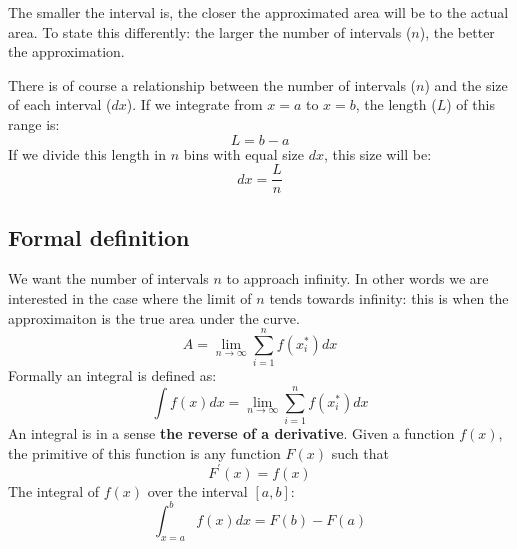 \documentclass[a4paper]{report}
\begin{document}
The smaller the interval is, the closer the approximated area will be to the actual area. To state this differently: the larger the number of intervals ($n$), the better the approximation. 
\begin{mdframed}
There is of course a relationship between the number of intervals ($n$) and the size of each interval ($dx$). If we integrate from $x=a$ to $x=b$, the length ($L$) of this range is:
\begin{equation*}
L = b - a
\end{equation*}
If we divide this length in $n$ bins with equal size $dx$, this size will be:
\begin{equation*}
dx = \frac{L}{n}
\end{equation*}
\end{mdframed}


\subsection{Formal definition}
We want the number of intervals $n$ to approach infinity. In other words we are interested in the case where the limit of $n$ tends towards infinity: this is when the approximaiton is the true area under the curve.
\begin{equation}
A=\lim\limits_{n \to \infty}\sum\limits_{i=1}^nf(x_{i}^*)dx
\end{equation}
Formally an integral is defined as:
\begin{equation}
\int f(x)dx=\lim\limits_{n \to \infty}\sum\limits_{i=1}^nf(x_{i}^*)dx
\end{equation}
An integral is in a sense \textbf{the reverse of a derivative}. Given a function $f(x)$, the primitive of this function is any function $F(x)$ such that
\begin{equation}
F^\prime(x)=f(x)
\end{equation}
The integral of $f(x)$ over the interval $\left[a,b\right]$:
\begin{equation}
\int_{x=a}^b f(x)dx=F(b)-F(a)
\end{equation}
\end{document}
